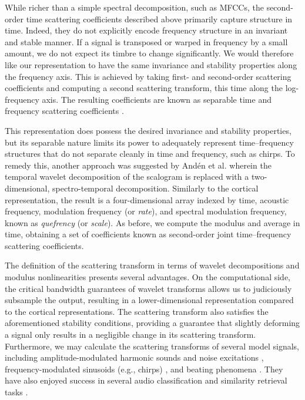 \documentclass{bmcart}
\newcommand{\ja}[1]{\textcolor{purple}{JA: #1}\xspace}
\begin{document}
While richer than a simple spectral decomposition, such as MFCCs, the second-order time scattering coefficients described above primarily capture structure in time.
Indeed, they do not explicitly encode frequency structure in an invariant and stable manner.
If a signal is transposed or warped in frequency by a small amount, we do not expect its timbre to change significantly.
We would therefore like our representation to have the same invariance and stability properties along the frequency axis.
This is achieved by taking first- and second-order scattering coefficients and computing a second scattering transform, this time along the log-frequency axis.
The resulting coefficients are known as separable time and frequency scattering coefficients \cite{anden2014tsp}.

This representation does possess the desired invariance and stability properties, but its separable nature limits its power to adequately represent time--frequency structures that do not separate cleanly in time and frequency, such as chirps.
To remedy this, another approach was suggested by And\'{e}n et al. \cite{anden2015mlsp,anden2019tsp} wherein the temporal wavelet decomposition of the scalogram is replaced with a two-dimensional, spectro-temporal decomposition.
Similarly to the cortical representation, the result is a four-dimensional array indexed by time, acoustic frequency, modulation frequency (or \emph{rate}), and spectral modulation frequency, known as \emph{quefrency} (or \emph{scale}).
As before, we compute the modulus and average in time, obtaining a set of coefficients known as second-order joint time--frequency scattering coefficients.

The definition of the scattering transform in terms of wavelet decompositions and modulus nonlinearities presents several advantages.
On the computational side, the critical bandwidth guarantees of wavelet transforms allows us to judiciously subsample the output, resulting in a lower-dimensional representation compared to the cortical representations.
The scattering transform also satisfies the aforementioned stability conditions, providing a guarantee that slightly deforming a signal only results in a negligible change in its scattering transform.
Furthermore, we may calculate the scattering transforms of several model signals, including amplitude-modulated harmonic sounds and noise excitations \cite{anden2012scattering,anden2014tsp}, frequency-modulated sinusoids (e.g., chirps) \cite{anden2012scattering,anden2019tsp}, and beating phenomena \cite{anden2014tsp}.
They have also enjoyed success in several audio classification and similarity retrieval tasks \cite{anden2011multiscale,bauge2013representing,anden2014tsp,anden2019tsp,lostanlen2018jasmp,lostanlen2018extended}.
\end{document}
